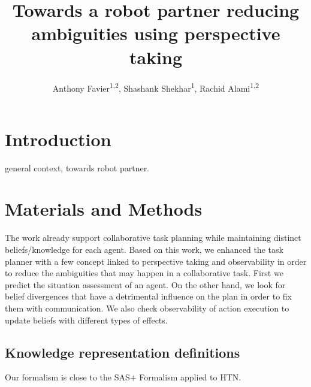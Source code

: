 \documentclass[letterpaper]{article} %
\title{Towards a robot partner reducing\\ ambiguities using perspective taking}
\author{
    Anthony Favier\textsuperscript{\rm 1,2},
    Shashank Shekhar\textsuperscript{\rm 1},
    Rachid Alami\textsuperscript{\rm 1,2}
}
\begin{document}


\maketitle

\begin{abstract}
\end{abstract}

\section{Introduction}
general context, towards robot partner. 


\clearpage
\section{Materials and Methods}

The work \cite{buisan:hal-03684211} already support collaborative task planning while maintaining distinct beliefs/knowledge for each agent. Based on this work, we enhanced the task planner with a few concept linked to perspective taking and observability in order to reduce the ambiguities that may happen in a collaborative task. First we predict the situation assessment of an agent. On the other hand, we look for belief divergences that have a detrimental influence on the plan in order to fix them with communication. We also check observability of action execution to update beliefs with different types of effects.

\subsection{Knowledge representation definitions}

Our formalism is close to the SAS+ Formalism applied to HTN.  
\end{document}
